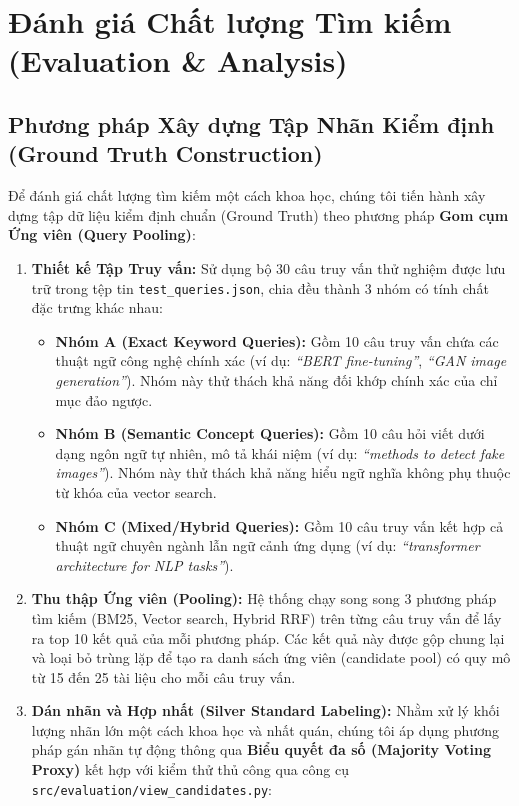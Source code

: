 \chapter{Đánh giá Chất lượng Tìm kiếm (Evaluation \& Analysis)}
\label{ch:evaluation}

\section{Phương pháp Xây dựng Tập Nhãn Kiểm định (Ground Truth Construction)}
Để đánh giá chất lượng tìm kiếm một cách khoa học, chúng tôi tiến hành xây dựng tập dữ liệu kiểm định chuẩn (Ground Truth) theo phương pháp \textbf{Gom cụm Ứng viên (Query Pooling)}:
\begin{enumerate}
    \item \textbf{Thiết kế Tập Truy vấn:} Sử dụng bộ 30 câu truy vấn thử nghiệm được lưu trữ trong tệp tin \texttt{test\_queries.json}, chia đều thành 3 nhóm có tính chất đặc trưng khác nhau:
    \begin{itemize}
        \item \textbf{Nhóm A (Exact Keyword Queries):} Gồm 10 câu truy vấn chứa các thuật ngữ công nghệ chính xác (ví dụ: \textit{``BERT fine-tuning''}, \textit{``GAN image generation''}). Nhóm này thử thách khả năng đối khớp chính xác của chỉ mục đảo ngược.
        \item \textbf{Nhóm B (Semantic Concept Queries):} Gồm 10 câu hỏi viết dưới dạng ngôn ngữ tự nhiên, mô tả khái niệm (ví dụ: \textit{``methods to detect fake images''}). Nhóm này thử thách khả năng hiểu ngữ nghĩa không phụ thuộc từ khóa của vector search.
        \item \textbf{Nhóm C (Mixed/Hybrid Queries):} Gồm 10 câu truy vấn kết hợp cả thuật ngữ chuyên ngành lẫn ngữ cảnh ứng dụng (ví dụ: \textit{``transformer architecture for NLP tasks''}).
    \end{itemize}
    \item \textbf{Thu thập Ứng viên (Pooling):} Hệ thống chạy song song 3 phương pháp tìm kiếm (BM25, Vector search, Hybrid RRF) trên từng câu truy vấn để lấy ra top 10 kết quả của mỗi phương pháp. Các kết quả này được gộp chung lại và loại bỏ trùng lặp để tạo ra danh sách ứng viên (candidate pool) có quy mô từ 15 đến 25 tài liệu cho mỗi câu truy vấn.
    \item \textbf{Dán nhãn và Hợp nhất (Silver Standard Labeling):} Nhằm xử lý khối lượng nhãn lớn một cách khoa học và nhất quán, chúng tôi áp dụng phương pháp gán nhãn tự động thông qua \textbf{Biểu quyết đa số (Majority Voting Proxy)} kết hợp với kiểm thử thủ công qua công cụ \texttt{src/evaluation/view\_candidates.py}:

\end{enumerate}
